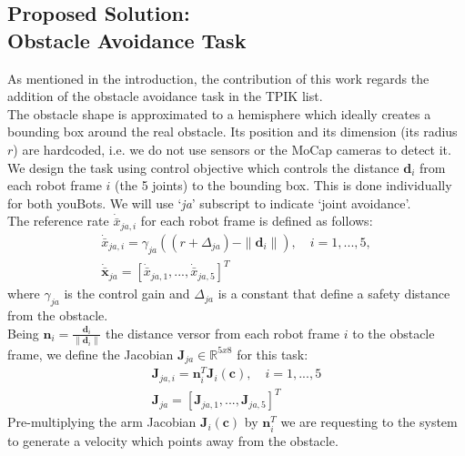 \documentclass[a4paper, 12pt, notitlepage]{article}
\begin{document}
\begin{multicols}{2}
		\section{Proposed Solution: \\ \hspace*{20px}Obstacle Avoidance Task} \label{sec:oat}
		\hspace{7px} As mentioned in the introduction, the contribution of this work regards the addition of the obstacle avoidance task in the TPIK list. \\
		The obstacle shape is approximated to a hemisphere which ideally creates a bounding box around the real obstacle.  
		Its position and its dimension (its radius $r$) are hardcoded, i.e. we do not use sensors or the MoCap cameras to detect it.  \\
		We design the task using control objective which controls the distance $\boldsymbol{d}_i$ from each robot frame $i$ (the 5 joints) to the bounding box. This is done individually for both youBots. We will use `\textit{ja}' subscript to indicate `joint avoidance'. \\
		The reference rate $\dot{\bar{x}}_{ja,i}$ for each robot frame is defined as follows:
		\begin{equation}
		\begin{gathered}
		\dot{\bar{x}}_{ja,i} = \gamma_{ja}((r + \Delta_{ja}) - \|\boldsymbol{d}_i\|), \quad i=1,...,5, \\
		\dot{\bar{\boldsymbol{x}}}_{ja} = [\dot{\bar{x}}_{ja,1},...,\dot{\bar{x}}_{ja,5}]^T
		\end{gathered}
		\end{equation}
		where $\gamma_{ja}$ is the control gain and $\Delta_{ja}$ is a constant that define a safety distance from the obstacle. \\
		Being $\boldsymbol{n}_i = \frac{\boldsymbol{d}_i}{\|\boldsymbol{d}_i\|}$ the distance versor from each robot frame $i$ to the obstacle frame, we define the Jacobian $\boldsymbol{J}_{ja} \in \mathbb{R}^{5x8}$ for this task:
		\begin{equation}
		\begin{gathered}
		\boldsymbol{J}_{ja,i} = \boldsymbol{n}^T_i \boldsymbol{J}_i(\boldsymbol{c}), \quad i=1,...,5 \\
		\boldsymbol{J}_{ja} = [\boldsymbol{J}_{ja,1},...,\boldsymbol{J}_{ja,5}]^T
		\end{gathered}
		\end{equation}
		Pre-multiplying the arm Jacobian $\boldsymbol{J}_i(\boldsymbol{c})$ by $\boldsymbol{n}_i^T$ we are requesting to the system to generate a velocity which points away from the obstacle. \\  

\end{multicols}
\end{document}
